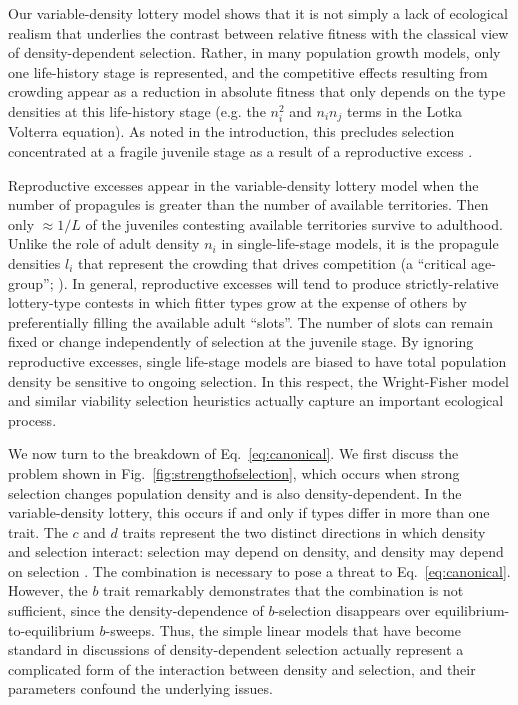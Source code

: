 \documentclass[12pt]{article}
\begin{document}
Our variable-density lottery model shows that it is not simply a lack of ecological realism that underlies the contrast between relative fitness with the classical view of density-dependent selection. Rather, in many population growth models, only one life-history stage is represented, and the competitive effects resulting from crowding appear as a reduction in absolute fitness that only depends on the type densities at this life-history stage (e.g. the $n_i^2$ and $n_in_j$ terms in the Lotka Volterra equation). As noted in the introduction, this precludes selection concentrated at a fragile juvenile stage as a result of a reproductive excess \citep{chesson_1983,turner1968population,kimura1969natural,nei1971fertility}. 

Reproductive excesses appear in the variable-density lottery model when the number of propagules is greater than the number of available territories. Then only $\approx 1/L$ of the juveniles contesting available territories survive to adulthood. Unlike the role of adult density $n_i$ in single-life-stage models, it is the propagule densities $l_i$ that represent the crowding that drives competition (a ``critical age-group''; \citealt[pp. 54]{charlesworth_1994}). In general, reproductive excesses will tend to produce strictly-relative lottery-type contests in which fitter types grow at the expense of others by preferentially filling the available adult ``slots''. The number of slots can remain fixed or change independently of selection at the juvenile stage. By ignoring reproductive excesses, single life-stage models are biased to have total population density be sensitive to ongoing selection. In this respect, the Wright-Fisher model and similar viability selection heuristics actually capture an important ecological process.

We now turn to the breakdown of Eq.~\eqref{eq:canonical}. We first discuss the problem shown in Fig.~\ref{fig:strengthofselection}, which occurs when strong selection changes population density and is also density-dependent. In the variable-density lottery, this occurs if and only if types differ in more than one trait. The $c$ and $d$ traits represent the two distinct directions in which density and selection interact: selection may depend on density, and density may depend on selection \citep{prout_1980}. The combination is necessary to pose a threat to Eq.~\eqref{eq:canonical}. However, the $b$ trait remarkably demonstrates that the combination is not sufficient, since the density-dependence of $b$-selection disappears over equilibrium-to-equilibrium $b$-sweeps. Thus, the simple linear models that have become standard in discussions of density-dependent selection \citep{roughgarden_1979,christiansen_2004,mallet_2012,travis_2013} actually represent a complicated form of the interaction between density and selection, and their parameters confound the underlying issues. 
\end{document}
